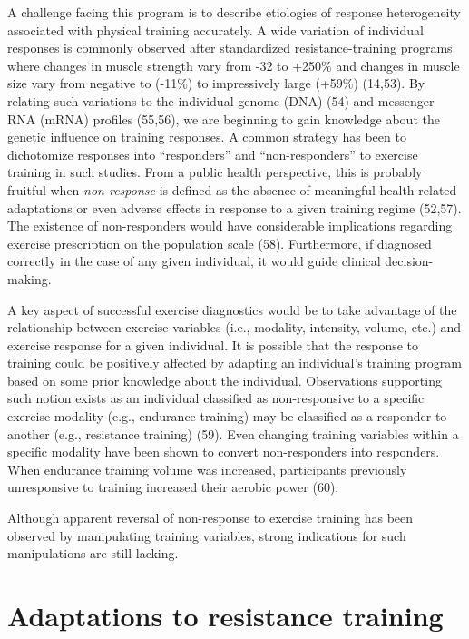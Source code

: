 \documentclass[twoside,10pt]{gihclass} %
\begin{document}
A challenge facing this program is to describe etiologies of response heterogeneity associated with physical training accurately. A wide variation of individual responses is commonly observed after standardized resistance-training programs where changes in muscle strength vary from -32 to +250\% and changes in muscle size vary from negative to (-11\%) to impressively large (+59\%)
(14,53).
By relating such variations to the individual genome (DNA)
(54)
and messenger RNA (mRNA) profiles
(55,56),
we are beginning to gain knowledge about the genetic influence on training responses.
A common strategy has been to dichotomize responses into ``responders'' and ``non-responders'' to exercise training in such studies.
From a public health perspective, this is probably fruitful when \emph{non-response} is defined as the absence of meaningful health-related adaptations or even adverse effects in response to a given training regime
(52,57).
The existence of non-responders would have considerable implications regarding exercise prescription on the population scale
(58).
Furthermore, if diagnosed correctly in the case of any given individual, it would guide clinical decision-making.

A key aspect of successful exercise diagnostics would be to take advantage of the relationship between exercise variables (i.e., modality, intensity, volume, etc.) and exercise response for a given individual.
It is possible that the response to training could be positively affected by adapting an individual's training program based on some prior knowledge about the individual.
Observations supporting such notion exists as an individual classified as non-responsive to a specific exercise modality (e.g., endurance training) may be classified as a responder to another (e.g., resistance training)
(59).
Even changing training variables within a specific modality have been shown to convert non-responders into responders. When endurance training volume was increased, participants previously unresponsive to training increased their aerobic power
(60).

Although apparent reversal of non-response to exercise training has been observed by manipulating training variables, strong indications for such manipulations are still lacking.

\hypertarget{adaptations-to-resistance-training}{%
\section{Adaptations to resistance training}\label{adaptations-to-resistance-training}}
\end{document}
